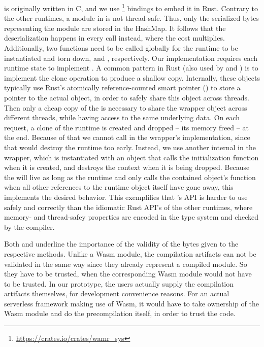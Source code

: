 \begin{description}[style=multiline, leftmargin=2.5cm, font=\bfseries]
    \item[Wamr]  is originally written in C, and we use  \footnote{\url{https://crates.io/crates/wamr\_sys}} bindings to embed it in Rust. Contrary to the other runtimes, a module in  is not thread-safe. Thus, only the serialized bytes representing the module are stored in the HashMap. It follows that the deserialization happens in every  call instead, where the cost multiplies.
    Additionally, two functions need to be called globally for the runtime to be instantiated and torn down,  and , respectively.
    Our implementation requires each runtime state to implement . A common pattern in Rust (also used by  and ) is to implement the clone operation to produce a shallow copy. Internally, these objects typically use Rust's atomically reference-counted smart pointer () to store a pointer to the actual object, in order to safely share this object across threads. Then only a cheap copy of the  is necessary to share the wrapper object across different threads, while having access to the same underlying data. On each request, a clone of the runtime is created and dropped -- its memory freed -- at the end. Because of that we cannot call  in the wrapper's  implementation, since that would destroy the runtime too early. Instead, we use another internal  in the wrapper, which is instantiated with an object that calls the initialization function when it is created, and destroys the context when it is being dropped. Because the  will live as long as the runtime and only calls the contained object's  function when all other references to the runtime object itself have gone away, this implements the desired behavior.
    This exemplifies that 's API is harder to use safely and correctly than the idiomatic Rust API's of the other runtimes, where memory- and thread-safey properties are encoded in the type system and checked by the compiler.

\end{description}

Both  and  underline the importance of the validity of the bytes given to the respective  methods. Unlike a Wasm module, the compilation artifacts can not be validated in the same way since they already represent a compiled module. So they have to be trusted, when the corresponding Wasm module would not have to be trusted. In our prototype, the users actually supply the compilation artifacts themselves, for development convenience reasons. For an actual serverless framework making use of Wasm, it would have to take ownership of the Wasm module and do the precompilation itself, in order to trust the code.

